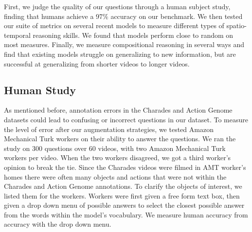 \documentclass[10pt,twocolumn,letterpaper]{article}
\begin{document}



First, we judge the quality of our questions through a human subject study, finding that humans achieve a 97\% accuracy on our benchmark. We then tested our suite of metrics on several recent models to measure different types of spatio-temporal reasoning skills. We found that models perform close to random on most measures. Finally, we measure compositional reasoning in several ways and find that existing models struggle on generalizing to new information, but are successful at generalizing from shorter videos to longer videos.

\subsection{Human Study}

As mentioned before, annotation errors in the Charades and Action Genome datasets could lead to confusing or incorrect questions in our dataset. To measure the level of error after our augmentation strategies, we tested Amazon Mechanical Turk workers on their ability to answer the questions. We ran the study on 300 questions over 60 videos, with two Amazon Mechanical Turk workers per video. When the two workers disagreed, we got a third worker's opinion to break the tie. Since the Charades videos were filmed in AMT worker's homes there were often many objects and actions that were not within the Charades and Action Genome annotations. To clarify the objects of interest, we listed them for the workers. Workers were first given a free form text box, then given a drop down menu of possible answers to select the closest possible answer from the words within the model's vocabulary. We measure human accuracy from accuracy with the drop down menu. 
\end{document}
